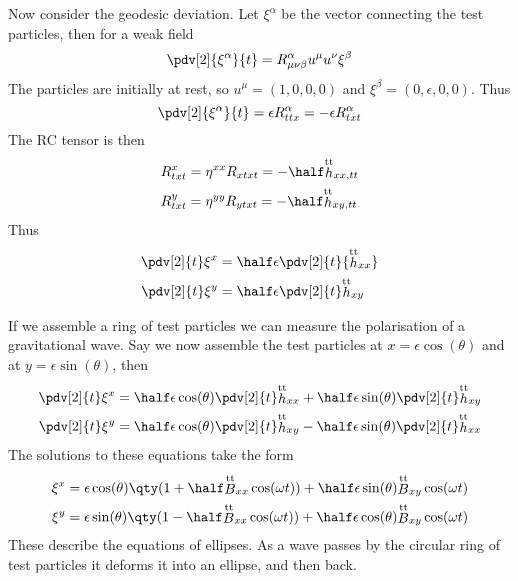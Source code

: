 Now consider the geodesic deviation. Let $\xi^{\alpha}$ be the vector
connecting the test particles, then for a weak field
\begin{equation}
  \label{eq:28}
  \pdv[2]{\xi^{\alpha}}{t} = R^{\alpha}_{\mu \nu \beta} u^{\mu} u^{\nu} \xi^{\beta}
\end{equation}
The particles are initially at rest, so $u^{\mu} = (1,0,0,0)$ and
$\xi^{\beta} = (0, \epsilon, 0, 0)$. Thus
\begin{equation}
  \label{eq:29}
  \pdv[2]{\xi^{\alpha}}{t} = \epsilon R^{\alpha}_{ttx} = - \epsilon R^{\alpha}_{txt}
\end{equation}
The RC tensor is then
\begin{subequations}
  \begin{align}
    R^x_{txt} &= \eta^{xx} R_{xtxt} = - \half \trt{h}_{xx,tt} \\
R^y_{txt} &= \eta^{yy} R_{ytxt} = - \half \trt{h}_{xy,tt}
  \end{align}
\end{subequations}
Thus
\begin{subequations}
\begin{align}
  \label{eq:30}
  \pdv[2]{t} \xi^x &= \half \epsilon \pdv[2]{t} {\trt{h}_{xx}} \\
\pdv[2]{t} \xi^y &= \half \epsilon \pdv[2]{t} \trt{h}_{xy}
\end{align}
\end{subequations}

If we assemble a ring of test particles we can measure the
polarisation of a gravitational wave. Say we now assemble the test
particles at $x = \epsilon \cos(\theta)$ and at $y = \epsilon
\sin(\theta)$, then
\begin{subequations}
  \begin{align}
    \pdv[2]{t} \xi^x &= \half \epsilon \cos(\theta) \pdv[2]{t} \trt{h}_{xx} + \half \epsilon \sin(\theta) \pdv[2]{t} \trt{h}_{xy} \\
\pdv[2]{t} \xi^y &=  \half \epsilon \cos(\theta) \pdv[2]{t} \trt{h}_{xy} - \half \epsilon \sin(\theta) \pdv[2]{t} \trt{h}_{xx}
  \end{align}
\end{subequations}
The solutions to these equations take the form
\begin{subequations}
  \begin{align}
    \xi^x &= \epsilon \cos(\theta) \qty( 1 + \half \trt{B}_{xx} \cos(\omega t)) + \half \epsilon \sin(\theta) \trt{B}_{xy} \cos(\omega t) \\
\xi^y &= \epsilon \sin(\theta) \qty( 1 - \half \trt{B}_{xx} \cos(\omega t) ) + \half \epsilon \cos(\theta) \trt{B}_{xy} \cos(\omega t)
  \end{align}
\end{subequations}
These describe the equations of ellipses. As a wave passes by the
circular ring of test particles it deforms it into an ellipse, and
then back.

